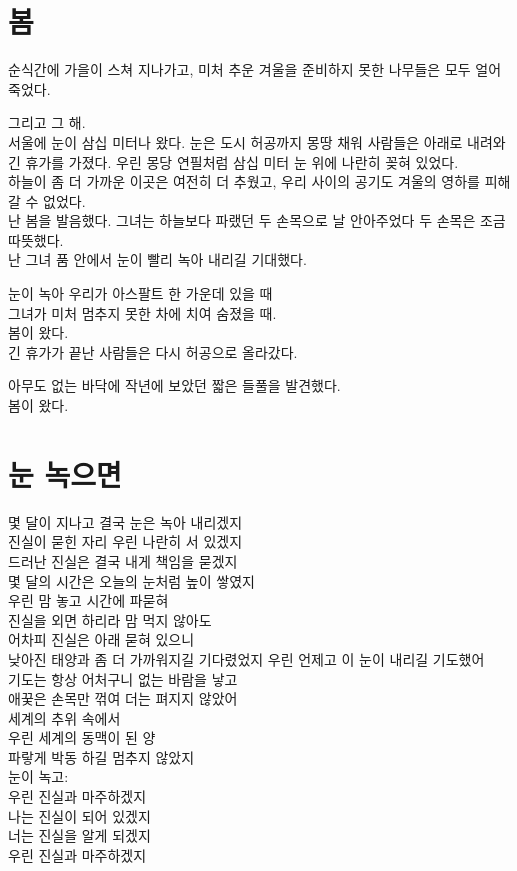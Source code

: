 \begin{article}
\hypertarget{uxbd04}{%
\chapter{봄}\label{uxbd04}}

순식간에 가을이 스쳐 지나가고, 미처 추운 겨울을 준비하지 못한 나무들은 모두 얼어 죽었다.

그리고 그 해.\\
서울에 눈이 삼십 미터나 왔다. 눈은 도시 허공까지 몽땅 채워 사람들은 아래로 내려와 긴 휴가를 가졌다. 우린 몽당 연필처럼 삼십 미터 눈 위에 나란히 꽂혀 있었다.\\
하늘이 좀 더 가까운 이곳은 여전히 더 추웠고, 우리 사이의 공기도 겨울의 영하를 피해갈 수 없었다.\\
난 봄을 발음했다. 그녀는 하늘보다 파랬던 두 손목으로 날 안아주었다 두 손목은 조금 따뜻했다.\\
난 그녀 품 안에서 눈이 빨리 녹아 내리길 기대했다.

눈이 녹아 우리가 아스팔트 한 가운데 있을 때\\
그녀가 미처 멈추지 못한 차에 치여 숨졌을 때.\\
봄이 왔다.\\
긴 휴가가 끝난 사람들은 다시 허공으로 올라갔다.

아무도 없는 바닥에 작년에 보았던 짧은 들풀을 발견했다.\\
봄이 왔다.
\end{article}

\begin{article}
\hypertarget{uxb208-uxb179uxc73cuxba74}{%
\chapter{눈 녹으면}\label{uxb208-uxb179uxc73cuxba74}}

몇 달이 지나고 결국 눈은 녹아 내리겠지\\
진실이 묻힌 자리 우린 나란히 서 있겠지\\
드러난 진실은 결국 내게 책임을 묻겠지\\
몇 달의 시간은 오늘의 눈처럼 높이 쌓였지\\
우린 맘 놓고 시간에 파묻혀\\
진실을 외면 하리라 맘 먹지 않아도\\
어차피 진실은 아래 묻혀 있으니\\
낮아진 태양과 좀 더 가까워지길 기다렸었지 우린 언제고 이 눈이 내리길 기도했어\\
기도는 항상 어처구니 없는 바람을 낳고\\
애꿎은 손목만 꺾여 더는 펴지지 않았어\\
세계의 추위 속에서\\
우린 세계의 동맥이 된 양\\
파랗게 박동 하길 멈추지 않았지\\
눈이 녹고:\\
우린 진실과 마주하겠지\\
나는 진실이 되어 있겠지\\
너는 진실을 알게 되겠지\\
우린 진실과 마주하겠지
\end{article}

